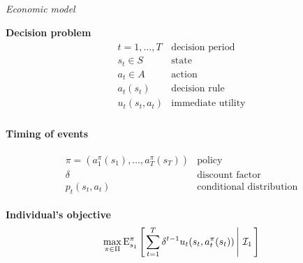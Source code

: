 \begin{frame}\begin{center}
		\LARGE\textit{Economic model}
\end{center}\end{frame}
\begin{frame}
\textbf{Decision problem}
\begin{align*}\begin{array}{ll}
t = 1, \hdots, T& \text{decision period} \\
s_t\in S & \text{state}  \\
a_t\in A & \text{action} \\
a_t(s_t) & \text{decision rule} \\
u_t(s_t, a_t) & \text{immediate utility}\\
\end{array}\end{align*}
\end{frame}
\begin{frame}
\begin{center}\textbf{Timing of events}\vspace{0.9cm}
\scalebox{0.9}{\hspace{-0.2cm}}
\end{center}
\end{frame}
\begin{frame}
\begin{align*}\begin{array}{ll}
\pi = (a^\pi_1(s_1), \hdots, a^\pi_T(s_T)) & \text{policy}\\
\delta & \text{discount factor} \\
p_t(s_t, a_t) & \text{conditional distribution}
\end{array}\end{align*}
\end{frame}
\begin{frame}
\textbf{Individual's objective}\vspace{0.3cm}
\begin{align*}
\max_{\pi \in\Pi} \mathrm{E}_{s_1}^\pi\left[\left.\sum^{T}_{t = 1}  \delta^{t - 1} u_t(s_t, a^\pi_t(s_t))\,\right\vert\,\mathcal{I}_1\,\right]
\end{align*}
\end{frame}
